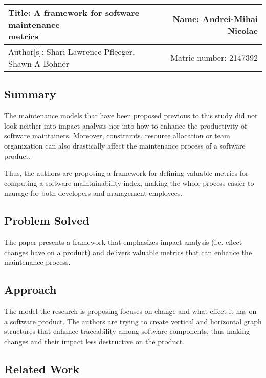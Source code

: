 \documentclass[a4paper,12pt]{article}
\begin{document}
 \begin{center}
   \begin{tabular}{ | l | r | }
    \hline
    \parbox[t]{5cm}{Title:  A framework for software maintenance
                    \\ metrics} 
     & Name: Andrei-Mihai Nicolae \\ 
     \hline
     \parbox[t]{5cm}{Author[s]: Shari Lawrence Pfleeger,
                    \\ Shawn A Bohner} 
      & Matric number: 2147392 \\
    \hline
   \end{tabular}
 \end{center}

\subsection{Summary}

The maintenance models that have been proposed previous to this study
did not look neither into impact analysis nor into how to enhance the
productivity of software maintainers. Moreover, constraints, resource
allocation or team organization can also drastically affect the
maintenance process of a software product. 

Thus, the authors are proposing a framework for defining valuable
metrics for computing a software maintainability index, making the
whole process easier to manage for both developers and management 
employees.

\subsection{Problem Solved}

The paper presents a framework that emphasizes impact analysis 
(i.e. effect changes have on a product) and delivers valuable 
metrics that can enhance the maintenance process.

\subsection{Approach}

The model the research is proposing focuses on change and what
effect it has on a software product. The authors are trying to 
create vertical and horizontal graph structures that enhance
traceability among software components, thus making changes and 
their impact less destructive on the product.

\subsection{Related Work}
\end{document}
